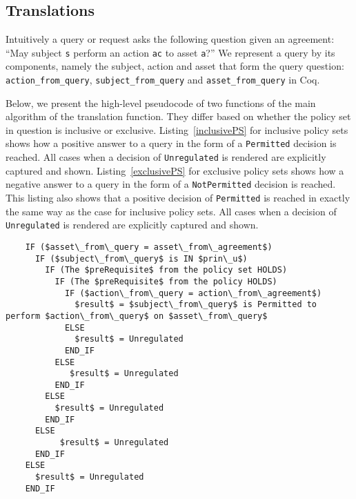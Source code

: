 \documentclass[runningheads,a4paper]{llncs}
\newcommand{\syn}{\texttt}
\begin{document}
\subsection{Translations}\label{sec:translationfuncs}

Intuitively a query or request asks the following question given an agreement: ``May subject \syn{s} perform an action \syn{ac} to asset \syn{a}?'' We represent a query by its components, namely the subject, action and asset that form the query question: \syn{action_from_query}, \syn{subject_from_query} and \syn{asset_from_query} in Coq. 

Below, we present the high-level pseudocode of two functions of the
main algorithm of the translation function.  They differ based on
whether the policy set in question is inclusive or exclusive.
%
Listing~\ref{inclusivePS} for inclusive policy sets shows how a positive answer to a query in the form of a \syn{Permitted} decision is reached. All cases when a decision of \syn{Unregulated} is rendered are explicitly captured and shown. Listing~\ref{exclusivePS} for exclusive policy sets shows how a negative answer to a query in the form of a \syn{NotPermitted} decision is reached. This listing also shows that a positive decision of \syn{Permitted} is reached in exactly the same way as the case for inclusive policy sets. All cases when a decision of \syn{Unregulated} is rendered are explicitly captured and shown.

\begin{lstlisting}
    IF ($asset\_from\_query = asset\_from\_agreement$)
      IF ($subject\_from\_query$ is IN $prin\_u$)
        IF (The $preRequisite$ from the policy set HOLDS)
          IF (The $preRequisite$ from the policy HOLDS)
            IF ($action\_from\_query = action\_from\_agreement$)
              $result$ = $subject\_from\_query$ is Permitted to perform $action\_from\_query$ on $asset\_from\_query$
            ELSE
              $result$ = Unregulated
            END_IF            
          ELSE
             $result$ = Unregulated
          END_IF
        ELSE
          $result$ = Unregulated
        END_IF
      ELSE
           $result$ = Unregulated
      END_IF
    ELSE
      $result$ = Unregulated
    END_IF
\end{lstlisting}
\end{document}
